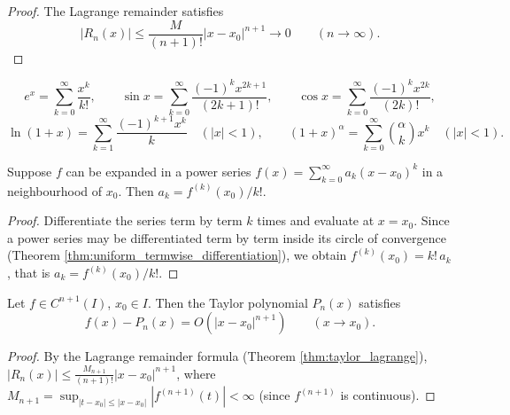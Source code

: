 \begin{proof}
The Lagrange remainder satisfies
\[
|R_n(x)| \le \frac{M}{(n+1)!}|x - x_0|^{n+1} \to 0 \qquad (n \to \infty).
\]
\end{proof}

\begin{example}\label{ex:taylor_examples}
\[
e^x = \sum_{k=0}^{\infty} \frac{x^k}{k!}, \qquad
\sin x = \sum_{k=0}^{\infty} \frac{(-1)^k x^{2k+1}}{(2k+1)!}, \qquad
\cos x = \sum_{k=0}^{\infty} \frac{(-1)^k x^{2k}}{(2k)!},
\]
\[
\ln(1+x) = \sum_{k=1}^{\infty} \frac{(-1)^{k+1} x^k}{k} \quad (|x| < 1), \qquad
(1+x)^{\alpha} = \sum_{k=0}^{\infty} \binom{\alpha}{k} x^k \quad (|x| < 1).
\]
\end{example}

\begin{proposition}\label{prop:taylor_coefficient_uniqueness}
Suppose $f$ can be expanded in a power series $f(x) = \sum_{k=0}^{\infty} a_k (x-x_0)^k$ in a neighbourhood of $x_0$. Then $a_k = f^{(k)}(x_0)/k!$.
\end{proposition}

\begin{proof}
Differentiate the series term by term $k$ times and evaluate at $x = x_0$. Since a power series may be differentiated term by term inside its circle of convergence (Theorem \ref{thm:uniform_termwise_differentiation}), we obtain $f^{(k)}(x_0) = k!\,a_k$, that is $a_k = f^{(k)}(x_0)/k!$.
\end{proof}

\begin{corollary}\label{cor:taylor_approximation_order}
Let $f \in C^{n+1}(I)$, $x_0 \in I$. Then the Taylor polynomial $P_n(x)$ satisfies
\[
f(x) - P_n(x) = O(|x - x_0|^{n+1}) \qquad (x \to x_0).
\]
\end{corollary}

\begin{proof}
By the Lagrange remainder formula (Theorem \ref{thm:taylor_lagrange}), $|R_n(x)| \le \frac{M_{n+1}}{(n+1)!}|x-x_0|^{n+1}$, where $M_{n+1} = \sup_{|t-x_0| \le |x-x_0|}|f^{(n+1)}(t)| < \infty$ (since $f^{(n+1)}$ is continuous).
\end{proof}

